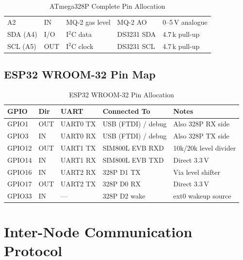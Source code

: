 \documentclass[12pt,a4paper]{article}
\begin{document}
\begin{table}[H]
\begin{tabular}{@{} C{1.8cm} C{1.2cm} L{3.2cm} L{3.8cm} L{3cm} @{}}
A2             & IN           & MQ-2 gas level      & MQ-2 AO                        & 0--5\,V analogue            \\
SDA (A4)       & I/O          & I$^2$C data         & DS3231 SDA                     & 4.7\,k pull-up              \\
SCL (A5)       & OUT          & I$^2$C clock        & DS3231 SCL                     & 4.7\,k pull-up              \\
\bottomrule
\end{tabular}
\caption{ATmega328P Complete Pin Allocation}
\end{table}

\subsection{ESP32 WROOM-32 Pin Map}

\begin{table}[H]
\centering
\small
\begin{tabular}{@{} C{2cm} C{1.2cm} C{2cm} L{3.8cm} L{3cm} @{}}
\toprule
\textbf{GPIO} & \textbf{Dir} & \textbf{UART} & \textbf{Connected To}   & \textbf{Notes}        \\
\midrule
GPIO1         & OUT          & UART0 TX      & USB (FTDI) / debug      & Also 328P RX side     \\
GPIO3         & IN           & UART0 RX      & USB (FTDI) / debug      & Also 328P TX side     \\
GPIO12        & OUT          & UART1 TX      & SIM800L EVB RXD         & 10k/20k level divider \\
GPIO14        & IN           & UART1 RX      & SIM800L EVB TXD         & Direct 3.3\,V         \\
GPIO16        & IN           & UART2 RX      & 328P D1 TX              & Via level shifter     \\
GPIO17        & OUT          & UART2 TX      & 328P D0 RX              & Direct 3.3\,V         \\
GPIO33        & IN           & ---           & 328P D2 wake            & ext0 wakeup source    \\
\bottomrule
\end{tabular}
\caption{ESP32 WROOM-32 Pin Allocation}
\end{table}

\section{Inter-Node Communication Protocol}
\end{document}
